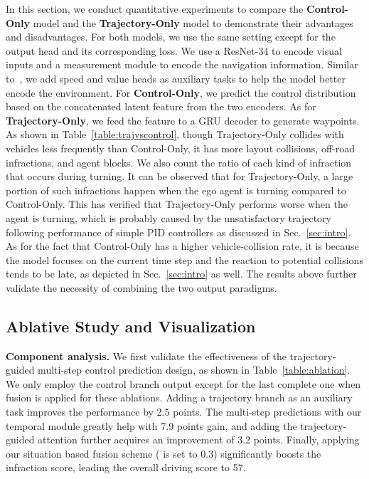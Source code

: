 \documentclass{article}
\begin{document}
In this section, we conduct quantitative experiments to compare the \textbf{Control-Only} model and the \textbf{Trajectory-Only} model to demonstrate their advantages and disadvantages.
For both models, we use the same setting except for the output head and its corresponding loss. We use a ResNet-34 to encode visual inputs and a measurement module to encode the navigation information. Similar to~\citep{zhang2021roach}, we add speed and value heads as auxiliary tasks to help the model better encode the environment.
For \textbf{Control-Only}, we predict the control distribution based on the concatenated latent feature from the two encoders.
As for \textbf{Trajectory-Only}, we feed the feature to a GRU decoder to generate waypoints. 
As shown in Table~\ref{table:trajvscontrol}, though Trajectory-Only collides with vehicles less frequently than  Control-Only, it has more layout collisions, off-road infractions, and agent blocks.
We also count the ratio of each kind of infraction that occurs during turning. It can be observed that for Trajectory-Only, a large portion of such infractions happen when the ego agent is turning compared to Control-Only.
This has verified that Trajectory-Only performs worse when the agent is turning, which is probably caused by the unsatisfactory trajectory following performance of simple PID controllers as discussed in Sec.~\ref{sec:intro}.
As for the fact that Control-Only has a higher vehicle-collision rate, it is because the model focuses on the current time step and the reaction to potential collisions tends to be late, as depicted in Sec.~\ref{sec:intro} as well. The results above further validate the necessity of combining the two output paradigms.



\subsection{Ablative Study and Visualization} \label{sec:ablation}


\textbf{Component analysis.} We first validate the effectiveness of the trajectory-guided multi-step control prediction design, as shown in Table~\ref{table:ablation}.
We only employ the control branch output except for the last complete one when fusion is applied for these ablations. Adding a trajectory branch as an auxiliary task improves the performance by 2.5 points. The multi-step predictions with our temporal module greatly help with 7.9 points gain, and adding the trajectory-guided attention further acquires an improvement of 3.2 points. Finally, applying our situation based fusion scheme ( is set to 0.3) significantly boosts the infraction score, leading the overall driving score to 57.
\end{document}
